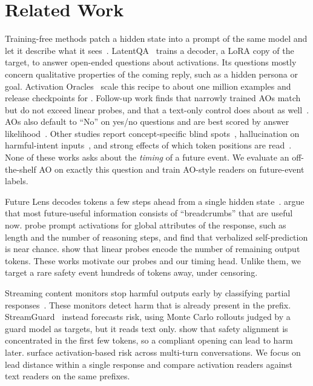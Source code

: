\section{Related Work}
\label{sec:related}

Training-free methods patch a hidden state into a prompt of the same model and let it describe what it sees~\citep{ghandeharioun2024patchscopes,chen2024selfie}. LatentQA~\citep{pan2024latentqa} trains a decoder, a LoRA copy of the target, to answer open-ended questions about activations. Its questions mostly concern qualitative properties of the coming reply, such as a hidden persona or goal. Activation Oracles~\citep{karvonen2025activation} scale this recipe to about one million examples and release checkpoints for \qwen. Follow-up work finds that narrowly trained AOs match but do not exceed linear probes, and that a text-only control does about as well~\citep{bauer2026building}. AOs also default to ``No'' on yes/no questions and are best scored by answer likelihood~\citep{bauer2026building,torrielli2026confidence}. Other studies report concept-specific blind spots~\citep{bersia2026blind}, hallucination on harmful-intent inputs~\citep{zhao2026faithful}, and strong effects of which token positions are read~\citep{torrielli2026selecting}. None of these works asks about the \emph{timing} of a future event. We evaluate an off-the-shelf AO on exactly this question and train AO-style readers on future-event labels.

Future Lens decodes tokens a few steps ahead from a single hidden state~\citep{pal2023futurelens}. \citet{wu2024planahead} argue that most future-useful information consists of ``breadcrumbs'' that are useful now. \citet{dong2025emergent} probe prompt activations for global attributes of the response, such as length and the number of reasoning steps, and find that verbalized self-prediction is near chance. \citet{merzouk2026remaining} show that linear probes encode the number of remaining output tokens. These works motivate our probes and our timing head. Unlike them, we target a rare safety event hundreds of tokens away, under censoring.

Streaming content monitors stop harmful outputs early by classifying partial responses~\citep{li2025judgment,sharma2025constitutional}. These monitors detect harm that is already present in the prefix. StreamGuard~\citep{kavumba2026predict} instead forecasts risk, using Monte Carlo rollouts judged by a guard model as targets, but it reads text only. \citet{qi2025shallow} show that safety alignment is concentrated in the first few tokens, so a compliant opening can lead to harm later. \citet{karny2026surfacing} surface activation-based risk across multi-turn conversations. We focus on lead distance within a single response and compare activation readers against text readers on the same prefixes.

